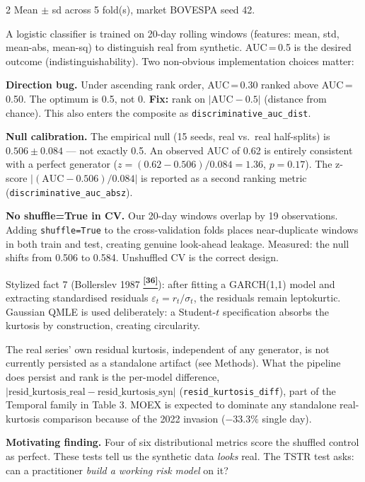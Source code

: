 \documentclass[10pt]{article}
\newcommand{\navybox}[2]{\begin{tcolorbox}[mybox={Navy}{LBg},title={#1}]#2\end{tcolorbox}}
\newcommand{\skybox}[2]{\begin{tcolorbox}[mybox={Sky}{BBg},title={#1}]#2\end{tcolorbox}}
\newcommand{\purplebox}[2]{\begin{tcolorbox}[mybox={Purple}{LBg},title={#1}]#2\end{tcolorbox}}
\newcommand{\tcite}[1]{%
  \hyperlink{R:#1}{\textsuperscript{\scriptsize\textbf{[#1]}}}}
\begin{document}
\begin{multicols}{2}
{\smallskip
{\small Mean $\pm$ sd across 5 fold(s), market BOVESPA seed 42.}}

\skybox{Discriminative AUC: Null Calibration and Direction Bug}{%
A logistic classifier is trained on 20-day rolling windows (features: mean, std, mean-abs, mean-sq) to distinguish real from synthetic. AUC\,=\,0.5 is the desired outcome (indistinguishability). Two non-obvious implementation choices matter:

\medskip
\textbf{Direction bug.} Under ascending rank order, AUC\,=\,0.30 ranked above AUC\,=\,0.50. The optimum is 0.5, not 0. \textbf{Fix:} rank on $|\text{AUC} - 0.5|$ (distance from chance). This also enters the composite as \texttt{discriminative\_auc\_dist}.

\medskip
\textbf{Null calibration.} The empirical null (15 seeds, real vs.\ real half-splits) is $0.506 \pm 0.084$ --- not exactly 0.5. An observed AUC of 0.62 is entirely consistent with a perfect generator ($z = (0.62 - 0.506)/0.084 = 1.36$, $p = 0.17$). The z-score $|(\text{AUC} - 0.506)/0.084|$ is reported as a second ranking metric (\texttt{discriminative\_auc\_absz}).

\medskip
\textbf{No shuffle=True in CV.} Our 20-day windows overlap by 19 observations. Adding \texttt{shuffle=True} to the cross-validation folds places near-duplicate windows in both train and test, creating genuine look-ahead leakage. Measured: the null shifts from 0.506 to 0.584. Unshuffled CV is the correct design.}

\columnbreak

\purplebox{Conditional Heavy Tails}{%
Stylized fact 7 (Bollerslev 1987\tcite{36}): after fitting a GARCH(1,1) model and extracting standardised residuals $\varepsilon_t = r_t / \sigma_t$, the residuals remain leptokurtic. Gaussian QMLE is used deliberately: a Student-$t$ specification absorbs the kurtosis by construction, creating circularity.

The real series' own residual kurtosis, independent of any generator, is not currently persisted as a standalone artifact (see Methods). What the pipeline does persist and rank is the per-model difference, $|\text{resid\_kurtosis\_real} - \text{resid\_kurtosis\_syn}|$ (\texttt{resid\_kurtosis\_diff}), part of the Temporal family in Table 3. MOEX is expected to dominate any standalone real-kurtosis comparison because of the 2022 invasion ($-33.3\%$ single day).}

\navybox{Downstream Utility: TSTR Protocol}{%
\textbf{Motivating finding.} Four of six distributional metrics score the shuffled control as perfect. These tests tell us the synthetic data \emph{looks} real. The TSTR test asks: can a practitioner \emph{build a working risk model} on it?

}
\end{multicols}
\end{document}

